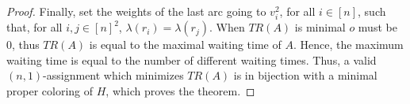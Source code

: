 \documentclass[a4paper,10pt]{article}
\newcommand\minpazl{\textsc{minpazl}\xspace}
\begin{document}
\begin{proof}
Finally, set the weights of the last arc going to $v_i^2$, for all $i \in [n]$, such that, for all $i,j \in [n]^2$, $\lambda(r_i) = \lambda(r_j)$.  When $TR(A)$ is minimal $o$ must be $0$, thus $TR(A)$ is equal to the maximal waiting time of $A$. Hence, the maximum waiting time is equal to the number of different waiting times. Thus, a valid $(n,1)$-assignment which minimizes $TR(A)$ is in bijection with a minimal proper coloring of $H$, which proves the theorem.
\end{proof}
      
      

      


      
%       
% 
%       
%       
% 
\end{document}
